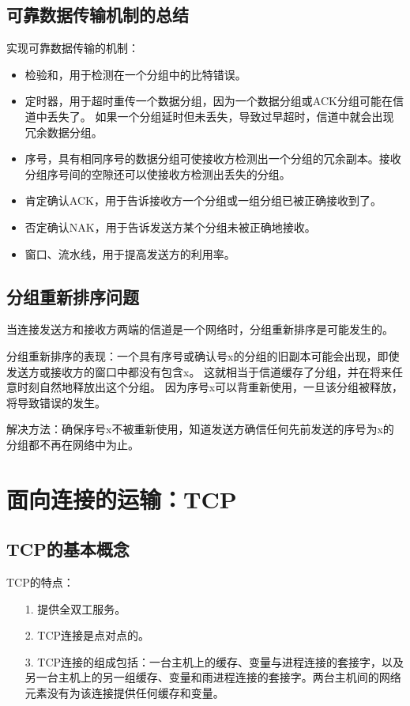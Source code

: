 \documentclass[a4paper,left=2.5cm,right=2.5cm,11pt]{article}
\begin{document}
\subsection{可靠数据传输机制的总结}
	实现可靠数据传输的机制：
	\begin{itemize}
		\item 检验和，用于检测在一个分组中的比特错误。
		\item 定时器，用于超时重传一个数据分组，因为一个数据分组或ACK分组可能在信道中丢失了。
			  如果一个分组延时但未丢失，导致过早超时，信道中就会出现冗余数据分组。
		\item 序号，具有相同序号的数据分组可使接收方检测出一个分组的冗余副本。接收分组序号间的空隙还可以使接收方检测出丢失的分组。
		\item 肯定确认ACK，用于告诉接收方一个分组或一组分组已被正确接收到了。
		\item 否定确认NAK，用于告诉发送方某个分组未被正确地接收。
		\item 窗口、流水线，用于提高发送方的利用率。
	\end{itemize}

\subsection{分组重新排序问题}
	当连接发送方和接收方两端的信道是一个网络时，分组重新排序是可能发生的。\par

	分组重新排序的表现：一个具有序号或确认号x的分组的旧副本可能会出现，即使发送方或接收方的窗口中都没有包含x。
	这就相当于信道缓存了分组，并在将来任意时刻自然地释放出这个分组。
	因为序号x可以背重新使用，一旦该分组被释放，将导致错误的发生。\par

	解决方法：确保序号x不被重新使用，知道发送方确信任何先前发送的序号为x的分组都不再在网络中为止。

\section{面向连接的运输：TCP}
\subsection{TCP的基本概念}
	TCP的特点：
	\begin{itemize}
		\item[1.] 提供全双工服务。
		\item[2.] TCP连接是点对点的。
		\item[3.] TCP连接的组成包括：一台主机上的缓存、变量与进程连接的套接字，以及另一台主机上的另一组缓存、变量和雨进程连接的套接字。两台主机间的网络元素没有为该连接提供任何缓存和变量。
	\end{itemize}
\end{document}
